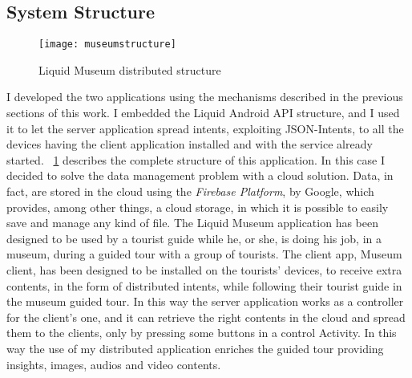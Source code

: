 \subsection{System Structure}
\begin{figure}[h]
	\centering
	\texttt{[image: museumstructure]}
	\caption{Liquid Museum distributed structure}
	\label{fig:5.10}
\end{figure}
I developed the two applications using the mechanisms described in the previous sections of this work. I embedded the Liquid Android API structure, and I used it to let the server application spread intents, exploiting JSON-Intents, to all the devices having the client application installed and with the service already started. \figurename~\ref{fig:5.10} describes the complete structure of this application. In this case I decided to solve the data management problem with a cloud solution. Data, in fact, are stored in the cloud using the \textit{Firebase Platform}, by Google, which provides, among other things, a cloud storage, in which it is possible to easily save and manage any kind of file. The Liquid Museum application has been designed to be used by a tourist guide while he, or she, is doing his job, in a museum, during a guided tour with a group of tourists. The client app, Museum client, has been designed to be installed on the tourists' devices, to receive extra contents, in the form of distributed intents, while following their tourist guide in the museum guided tour. In this way the server application works as a controller for the client's one, and it can retrieve the right contents in the cloud and spread them to the clients, only by pressing some buttons in a control Activity. In this way the use of my distributed application enriches the guided tour providing insights, images, audios and video contents.
